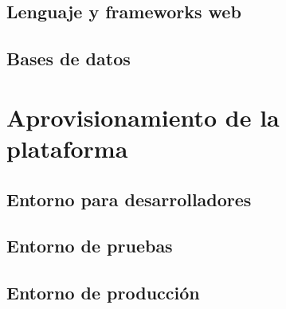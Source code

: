 \subsection{Lenguaje y frameworks web}
\subsection{Bases de datos}
\section{Aprovisionamiento de la plataforma}
\subsection{Entorno para desarrolladores}
\subsection{Entorno de pruebas}
\subsection{Entorno de producción}






